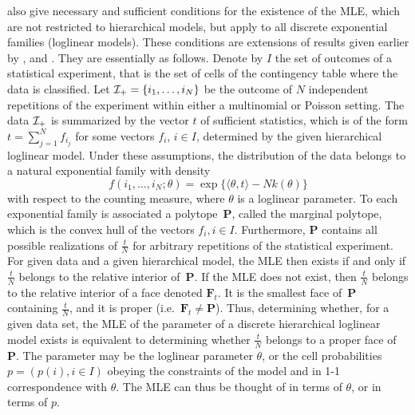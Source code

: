 \documentclass[aos,noinfoline]{imsart}
\newcommand{\Fbf}{\mathbf{F}}
\newcommand{\Pbf}{\mathbf{P}}
\theoremstyle{remark}
\theoremstyle{definition}
\begin{document}
\citet{FienbergRinaldo12:MLE_in_loglinear_models} also give necessary and sufficient conditions for the existence of the MLE, which
 are not restricted to hierarchical models, but  apply to all discrete exponential families (loglinear models).
These conditions are extensions of results given earlier by
\citet{Haberman74:Analysis_of_Frequency_Data}, \citet{Barndorff:exponential_families} and
\citet{EFRS06:Polyhedral_conditions_MLE}.
They are essentially as follows.
%
Denote by $I$ the set of outcomes of a statistical experiment, that is the set of cells of the contingency table where the data is classified.
%
Let ${\cal I}_{+}=\{i_{1},\dots,i_{N}\}$  be the outcome of $N$ independent repetitions of the experiment within either a multinomial or Poisson setting.  The data ${\cal I}_{+}$ is summarized by the vector $t$ of sufficient statistics, which is of the form $t=\sum_{j=1}^Nf_{i_j}$  for  some vectors $f_{i}$, $i\in I$, determined by the given hierarchical loglinear model.
Under these assumptions, the distribution of the data belongs to a natural exponential family with density
\begin{equation}
  \label{basic}
  f(i_{1},\dots,i_{N}; \theta) =\exp \{\langle \theta, t\rangle-Nk(\theta)\}
\end{equation}
with respect to the counting measure, where $\theta$ is a loglinear parameter.
To each exponential family is associated a
polytope~$\Pbf$, called the marginal polytope, which is the convex hull of the vectors $f_{i}, i\in I$.
Furthermore, $\Pbf$ contains all possible realizations of $\frac t N$ for arbitrary repetitions
of the statistical experiment.  For given data and a given hierarchical model, the MLE then exists if and only if
$\frac tN$ belongs to the relative interior of~$\Pbf$.  If the MLE does not exist, then $\frac tN$ belongs to the
relative interior of a face denoted $\Fbf_{t}$. It is the smallest face of~$\Pbf$ containing $\frac tN$, and it is
proper (i.e.~$\Fbf_{t}\neq\Pbf$).  Thus, determining whether, for a given data set, the MLE of the parameter of a discrete hierarchical
loglinear model exists is equivalent to determining whether $\frac t N$ belongs to a proper face of~$\Pbf$. The parameter  may be  the loglinear parameter $\theta$, or  the cell probabilities $p=(p(i), i\in I)$ obeying the constraints of the model and in 1-1 correspondence with $\theta$. The MLE can thus be thought
of in terms of $\theta$, or in terms of $p$.
\end{document}
